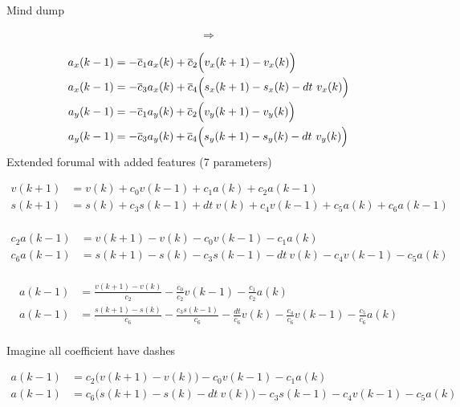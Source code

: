 \documentclass[10pt]{article}         %
\begin{document}
Mind dump


\begin{align}
\Rightarrow
\end{align}



\begin{align}
a_x(k-1) &= - \overline c_1 a_x(k)  + \overline c_2 \Bigl(v_x(k+1) - v_x(k)\Bigr)  \\
a_x(k-1) &= - \overline c_3 a_x(k)  + \overline c_4 \Bigl(s_x(k+1) - s_x(k) - dt \  v_x(k)\Bigr) \\
a_y(k-1) &= - \overline c_1 a_y(k)  + \overline c_2 \Bigl(v_y(k+1) - v_y(k)\Bigr)  \\
a_y(k-1) &= - \overline c_3 a_y(k)  + \overline c_4 \Bigl(s_y(k+1) - s_y(k) - dt \  v_y(k)\Bigr)
\end{align}
Extended forumal with added features (7 parameters)

\begin{align}
v(k+1) &= v(k) + c_0 v(k-1) + c_1 a(k) + c_2 a(k-1) \\
s(k+1) &= s(k) + c_3 s(k-1) + dt \  v(k) + c_4v(k-1) + c_5 a(k) + c_6 a(k-1) \\
\end{align}



\begin{align}
c_2 a(k-1) &= v(k+1) - v(k) - c_0 v(k-1) - c_1 a(k)                           \\
c_6 a(k-1) &= s(k+1) - s(k) - c_3 s(k-1) - dt \  v(k) - c_4v(k-1) - c_5 a(k)  \\
\end{align}

\begin{align}
a(k-1) &= \frac {v(k+1) - v(k)} {c_2} - \frac{c_0}{c_2} v(k-1) -\frac{c_1}{c_2} a(k)                           \\
a(k-1) &= \frac{ s(k+1) - s(k) }{c_6}  - \frac{ c_3 s(k-1) }{c_6}  - \frac{dt}{c_6} v(k) - \frac{c_4}{c_6}v(k-1) - \frac{c_5}{c_6} a(k)  \\
\end{align}

Imagine all coefficient have dashes

\begin{align}
a(k-1) &= c_2 \bigl( v(k+1) - v(k) \bigr)  - c_0 v(k-1) - c_1 a(k)                          \\
a(k-1) &= c_6 \bigl( s(k+1) - s(k) - dt \  v(k) \bigr) - c_3 s(k-1) - c_4v(k-1) - c_5 a(k)  \\
\end{align}
\end{document}
